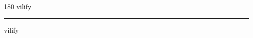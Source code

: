 
\begin{frame}
\begin{center}
\begin{turn}{180}
{\fontsize{2.5cm}{1em}\selectfont vilify}
\end{turn}
\vspace{1em}\par  
\hrule
\vspace{1em}\par  
{\fontsize{2.5cm}{1em}\selectfont vilify}
\end{center}
\end{frame}
